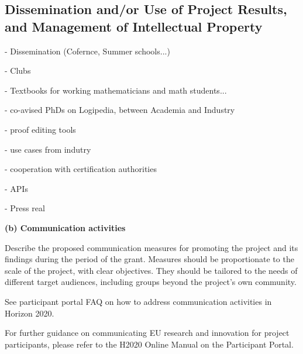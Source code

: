 \subsection{Dissemination and/or Use of Project Results, and Management of Intellectual Property}\label{sec:dissemination}


- Dissemination  (Cofernce, Summer schools...)

- Clubs

- Textbooks for working mathematicians and math students...

- co-avised PhDs on Logipedia, between Academia and Industry

- proof editing tools

- use cases from indutry

- cooperation with certification authorities

- APIs

- Press real




{\bf (b) Communication activities}

\begin{todo}{}\color{red}
  Describe the proposed communication measures for promoting the project and its findings during the period of the grant. Measures should be proportionate to the scale of the project, with clear objectives.  They should be tailored to the needs of different target audiences, including groups beyond the project's own community.

  See participant portal FAQ on how to address communication activities in Horizon 2020.

  For further guidance on communicating EU research and innovation for project participants, please refer to the H2020 Online Manual on the Participant Portal.
\end{todo}









